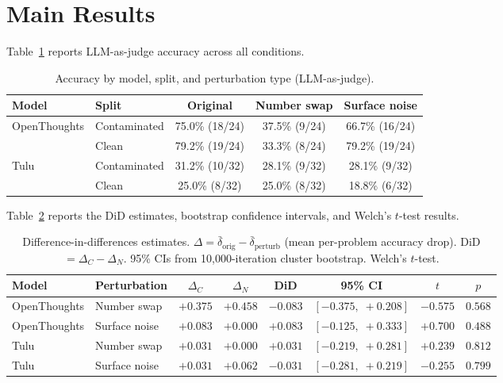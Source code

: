 \documentclass{article} %
\begin{document}
\section{Main Results}

Table~\ref{tab:accuracy} reports LLM-as-judge accuracy across all conditions.

\begin{table}[h]
\centering
\caption{Accuracy by model, split, and perturbation type (LLM-as-judge).}
\label{tab:accuracy}
\begin{tabular}{llccc}
\toprule
\textbf{Model} & \textbf{Split} & \textbf{Original} & \textbf{Number swap} & \textbf{Surface noise} \\
\midrule
\multirow{2}{*}{OpenThoughts}
  & Contaminated & 75.0\% (18/24) & 37.5\% (9/24)  & 66.7\% (16/24) \\
  & Clean        & 79.2\% (19/24) & 33.3\% (8/24)  & 79.2\% (19/24) \\
\midrule
\multirow{2}{*}{Tulu}
  & Contaminated & 31.2\% (10/32) & 28.1\% (9/32)  & 28.1\% (9/32)  \\
  & Clean        & 25.0\% (8/32)  & 25.0\% (8/32)  & 18.8\% (6/32)  \\
\bottomrule
\end{tabular}
\end{table}

Table~\ref{tab:did} reports the DiD estimates, bootstrap confidence intervals, and Welch's $t$-test results.

\begin{table}[h]
\centering
\caption{Difference-in-differences estimates. $\Delta = \bar{\delta}_{\text{orig}} - \bar{\delta}_{\text{perturb}}$ (mean per-problem accuracy drop). DiD $= \Delta_C - \Delta_N$. 95\% CIs from 10{,}000-iteration cluster bootstrap. Welch's $t$-test.}
\label{tab:did}
\begin{tabular}{llcccccc}
\toprule
\textbf{Model} & \textbf{Perturbation} & $\Delta_C$ & $\Delta_N$ & \textbf{DiD} & \textbf{95\% CI} & $t$ & $p$ \\
\midrule
OpenThoughts & Number swap   & $+0.375$ & $+0.458$ & $-0.083$ & $[-0.375,\;+0.208]$ & $-0.575$ & $0.568$ \\
OpenThoughts & Surface noise & $+0.083$ & $+0.000$ & $+0.083$ & $[-0.125,\;+0.333]$ & $+0.700$ & $0.488$ \\
Tulu         & Number swap   & $+0.031$ & $+0.000$ & $+0.031$ & $[-0.219,\;+0.281]$ & $+0.239$ & $0.812$ \\
Tulu         & Surface noise & $+0.031$ & $+0.062$ & $-0.031$ & $[-0.281,\;+0.219]$ & $-0.255$ & $0.799$ \\
\bottomrule
\end{tabular}
\end{table}
\end{document}
